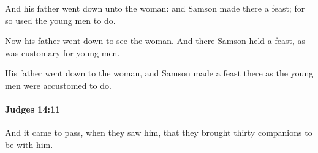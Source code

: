 			\begin{versebox}
					\item[BHS] 
					\item[ASV] And his father went down unto the woman: and Samson made there a feast; for so used the young men to do.
					\item[NIV] Now his father went down to see the woman. And there Samson held a feast, as was customary for young men.
					\item[NRSV] His father went down to the woman, and Samson made a feast there as the young men were accustomed to do.
			\end{versebox}

		\paragraph{Judges 14:11} %
			\label{JUDGES-14-11}

			And it came to pass, when they saw him, that they brought thirty companions to be with him.

